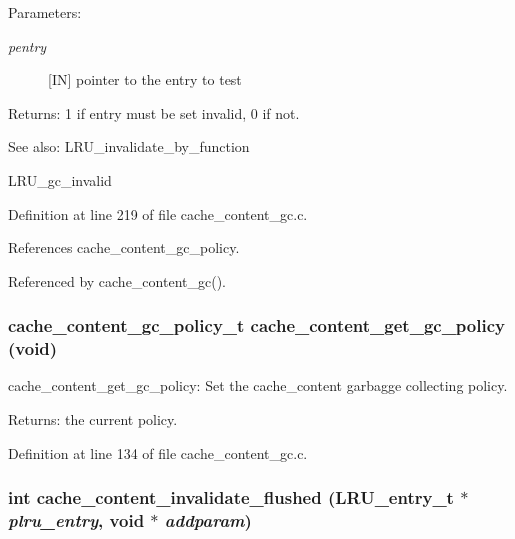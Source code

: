 \begin{Desc}
\item[Parameters:]
\begin{description}
\item[{\em pentry}][IN] pointer to the entry to test\end{description}
\end{Desc}
\begin{Desc}
\item[Returns:]1 if entry must be set invalid, 0 if not.\end{Desc}
\begin{Desc}
\item[See also:]LRU\_\-invalidate\_\-by\_\-function 

LRU\_\-gc\_\-invalid \end{Desc}


Definition at line 219 of file cache\_\-content\_\-gc.c.

References cache\_\-content\_\-gc\_\-policy.

Referenced by cache\_\-content\_\-gc().
\subsubsection{\setlength{\rightskip}{0pt plus 5cm}cache\_\-content\_\-gc\_\-policy\_\-t cache\_\-content\_\-get\_\-gc\_\-policy (void)}\label{cache__content__gc_8c_a2}


cache\_\-content\_\-get\_\-gc\_\-policy: Set the cache\_\-content garbagge collecting policy.

\begin{Desc}
\item[Returns:]the current policy. \end{Desc}


Definition at line 134 of file cache\_\-content\_\-gc.c.
\subsubsection{\setlength{\rightskip}{0pt plus 5cm}int cache\_\-content\_\-invalidate\_\-flushed (LRU\_\-entry\_\-t $\ast$ {\em plru\_\-entry}, void $\ast$ {\em addparam})}\label{cache__content__gc_8c_a9}




